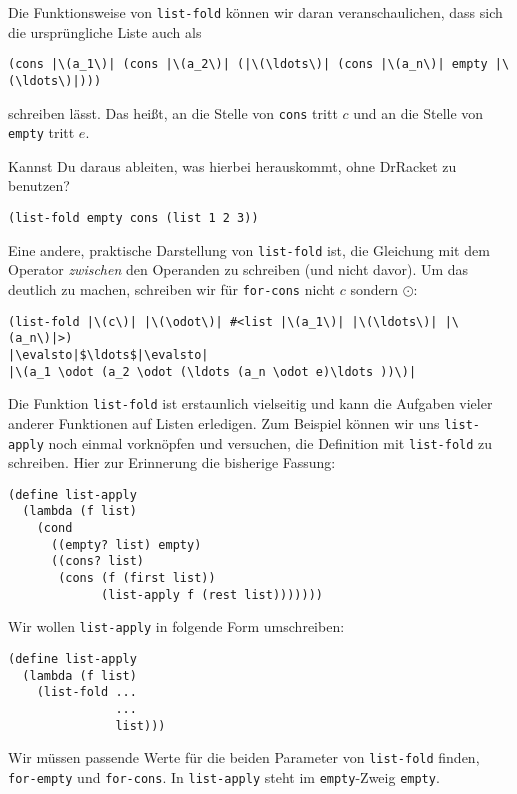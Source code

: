 Die Funktionsweise von \lstinline{list-fold} können wir daran
veranschaulichen, dass sich die ursprüngliche Liste auch als
%
\begin{lstlisting}
(cons |\(a_1\)| (cons |\(a_2\)| (|\(\ldots\)| (cons |\(a_n\)| empty |\(\ldots\)|)))
\end{lstlisting}
%
schreiben lässt.  Das heißt, an die Stelle von \lstinline{cons} tritt
$c$ und an die Stelle von \lstinline{empty} tritt $e$.

\begin{aufgabeinline}
  Kannst Du daraus ableiten, was hierbei herauskommt, ohne DrRacket zu
  benutzen?
\begin{lstlisting}
(list-fold empty cons (list 1 2 3))
\end{lstlisting}
\end{aufgabeinline}
%
Eine andere, praktische Darstellung von 
\lstinline{list-fold} ist, die Gleichung mit dem Operator
\emph{zwischen} den Operanden zu schreiben (und nicht davor). Um das
deutlich zu machen, schreiben wir für \lstinline{for-cons} nicht $c$
sondern $\odot$:
%
\begin{lstlisting}
(list-fold |\(c\)| |\(\odot\)| #<list |\(a_1\)| |\(\ldots\)| |\(a_n\)|>) 
|\evalsto|$\ldots$|\evalsto|
|\(a_1 \odot (a_2 \odot (\ldots (a_n \odot e)\ldots ))\)|
\end{lstlisting}
%
Die Funktion \lstinline{list-fold} ist erstaunlich vielseitig und kann
die Aufgaben vieler anderer Funktionen auf Listen erledigen.  Zum
Beispiel können wir uns \lstinline{list-apply} noch einmal vorknöpfen
und versuchen, die Definition mit \lstinline{list-fold} zu
schreiben.  Hier zur Erinnerung die bisherige Fassung:
%
\begin{lstlisting}
(define list-apply
  (lambda (f list)
    (cond
      ((empty? list) empty)
      ((cons? list)
       (cons (f (first list))
             (list-apply f (rest list)))))))
\end{lstlisting}
%
Wir wollen \lstinline{list-apply} in folgende Form umschreiben:
%
\begin{lstlisting}
(define list-apply
  (lambda (f list)
    (list-fold ...
               ...
               list)))
\end{lstlisting}
%
Wir müssen passende Werte für die beiden Parameter von
\lstinline{list-fold} finden, \lstinline{for-empty} und
\lstinline{for-cons}.  In \lstinline{list-apply} steht im
\lstinline{empty}-Zweig \lstinline{empty}.

